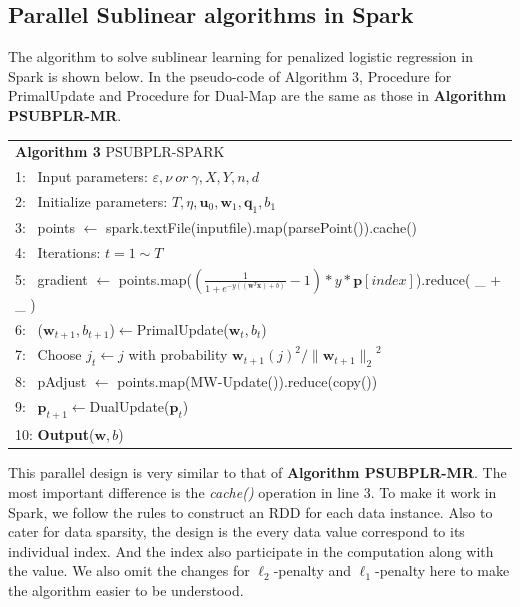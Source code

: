 \documentclass{llncs}
\newcommand{\bw}{\mathbf{w}}
\newcommand{\bp}{\mathbf{p}}
\newcommand{\bq}{\mathbf{q}}
\newcommand{\lc}{\left(}
\newcommand{\rc}{\right)}
\newcommand{\lj}{\lc j\rc}
\newcommand{\tspace}{\hspace*{2em}}
\begin{document}
\subsection{Parallel Sublinear algorithms in Spark}
The algorithm to solve sublinear learning for penalized logistic regression in Spark is shown below.
In the pseudo-code of Algorithm 3, Procedure for PrimalUpdate and Procedure for Dual-Map are the same as those in \textbf{Algorithm  PSUBPLR-MR}.
    \begin{table}[ht]
	\begin{tabular}{l}
    \hline\noalign{\smallskip}
	\textbf{Algorithm 3} PSUBPLR-SPARK \\
	\noalign{\smallskip}
	\hline
	\noalign{\smallskip}
    1:  ~Input parameters: $\varepsilon, \nu~or~\gamma, X, Y, n, d$ \\
    2:	~Initialize parameters: $T, \eta, {\mathbf{u}}_{0}, {\bw}_{1}, {\mathbf{\bq}}_{1}, {b}_{1}$\\
    3:  ~points $\leftarrow$ spark.textFile(inputfile).map(parsePoint()).cache() \\
    4:  ~Iterations: $t=1 \sim T$ \\
    5:  ~\tspace gradient $\leftarrow$ points.map($(\frac{1}{1+e^{-y((\bw^T \textbf{x})+b)}}-1) * y * \bp [index]$).reduce( \_ + \_ ) \\
    6:  ~\tspace ($\bw_{t+1}, b_{t+1}$)$\leftarrow$PrimalUpdate($\bw_t, b_t$) \\
    7:  ~\tspace Choose $j_t \leftarrow j$ with probability ${{\bw}_{t+1}\lj}^{2}/{\|{\bw}_{t+1}\|_2}^{2} $ \\
    8:  ~\tspace pAdjust $\leftarrow$ points.map(MW-Update()).reduce(copy()) \\
    9:  ~\tspace $\bp_{t+1}$$\leftarrow$DualUpdate($\bp_t$)  \\
    10: \textbf{Output}($\bw, b$) \\
    \hline
    \end{tabular}
	\end{table}

This parallel design is very similar to that of \textbf{Algorithm  PSUBPLR-MR}.
The most important difference is the \textit{cache()} operation in line 3.
To make it work in Spark, we follow the rules to construct an RDD for each data instance.
Also to cater for data sparsity, the design is the every data value correspond to its individual index. And the index also participate in the computation along with the value.
We also omit the changes for $\ell_2$-penalty and $\ell_1$-penalty here to make the algorithm easier to be understood.
\end{document}
